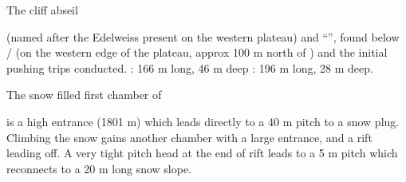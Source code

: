 \begin{pagefigure}
      \checkoddpage \ifoddpage \forcerectofloat \else \forceversofloat \fi
      \centering
  \caption{The  cliff abseil }
\end{pagefigure}

 (named after the Edelweiss present on the western plateau) and ``'', found below / (on the western edge
of the plateau, approx 100 m north of ) and the initial pushing trips conducted. : 166 m long, 46 m deep : 196 m long, 28 m deep.

\begin{marginfigure}
\caption{The snow filled first chamber of  }
\end{marginfigure}

 is a high entrance (1801 m) which leads directly to a 40 m pitch to a snow plug. Climbing the snow gains another chamber with a large entrance, and a rift leading off. A very tight pitch head at the end of rift leads to a 5 m pitch which reconnects to a 20 m long snow slope. 

